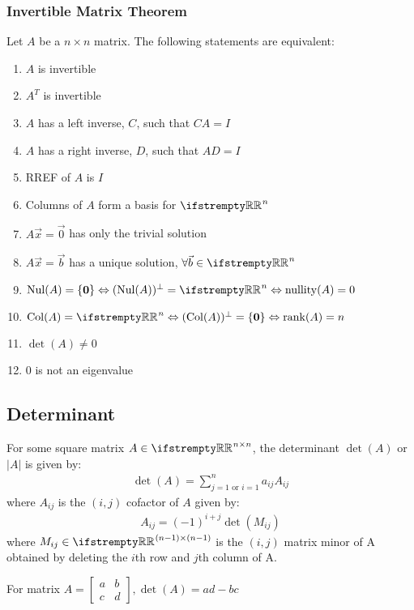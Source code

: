 \documentclass[12pt, a4paper]{article}
\begin{document}
\begin{multicols*}{3}
\subsubsection{Invertible Matrix Theorem}
Let $A$ be a $n \times n$ matrix. The following statements are equivalent:
\begin{enumerate}[\roman*.]
  \item $A$ is invertible
  \item $A^T$ is invertible
  \item $A$ has a left inverse, $C$, such that $CA = I$
  \item $A$ has a right inverse, $D$, such that $AD = I$
  \item RREF of $A$ is $I$
  \item Columns of $A$ form a basis for $\RR^n$
  \item $A\vec{x} = \vec{0}$ has only the trivial solution
  \item $A\vec{x} = \vec{b}$ has a unique solution, $\forall \vec{b} \in \RR^n$
  \item $\nul(A) = \{\mathbf{0}\} \Leftrightarrow (\nul(A))^{\perp} = \RR^n \Leftrightarrow \nullity(A) = 0$
  \item $\col(A) = \RR^n \Leftrightarrow (\col(A))^{\perp} = \{\mathbf{0}\}\Leftrightarrow \rank(A) = n$
  \item $\det(A) \neq 0$
  \item $0$ is not an eigenvalue
\end{enumerate}

\colbreak

\subsection{Determinant}
For some square matrix $A \in \RR^{n{\times}n}$, the determinant $\det(A)$ or $|A|$ is given by:
\begin{align*}
  \det(A) = \sum^n_{j=1 \text{ or } i=1}a_{ij}A_{ij}
\end{align*}
where $A_{ij}$ is the $(i, j)$ cofactor of $A$ given by:
\begin{align*}
  A_{ij} = (-1)^{i+j}\det(M_{ij})
\end{align*}
where $M_{ij} \in \RR^{(n-1){\times}(n-1)}$ is the $(i, j)$ matrix minor of A obtained by deleting the $i$th row and $j$th column of A.

For matrix $A = \begin{bmatrix} a & b \\ c & d\end{bmatrix}, \det(A) = ad-bc $


\end{multicols*}
\end{document}
